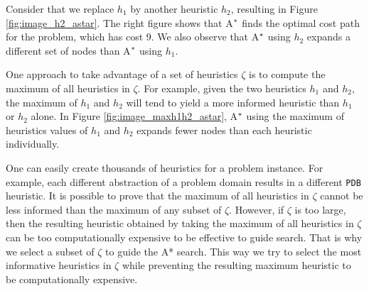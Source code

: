 Consider that we replace $h_{1}$ by another heuristic $h_2$, resulting in Figure \ref{fig:image_h2_astar}. The right figure shows that A$\sp{*}$ finds the optimal cost path for the problem, which has cost 9. We also observe that A$\sp{*}$ using $h_2$ expands a different set of nodes than A$\sp{*}$ using $h_1$.

One approach to take advantage of a set of heuristics $\zeta$ is to compute the maximum of all heuristics in $\zeta$. For example, given the two heuristics $h_1$ and $h_2$, the maximum of $h_1$ and $h_2$ will tend to yield a more informed heuristic than $h_1$ or $h_2$ alone. In Figure \ref{fig:image_maxh1h2_astar}, A$\sp{*}$ using the maximum of heuristics values of $h_{1}$ and $h_{2}$ expands fewer nodes than each heuristic individually.

One can easily create thousands of heuristics for a problem instance. For example, each different abstraction of a problem domain results in a different \texttt{PDB} heuristic. It is possible to prove that the maximum of all heuristics in $\zeta$ cannot be less informed than the maximum of any subset of $\zeta$. However, if $\zeta$ is too large, then the resulting heuristic obtained by taking the maximum of all heuristics in $\zeta$ can be too computationally expensive to be effective to guide search. That is why we select a subset of $\zeta$ to guide the A* search. This way we try to select the most informative heuristics in $\zeta$ while preventing the resulting maximum heuristic to be computationally expensive. 





